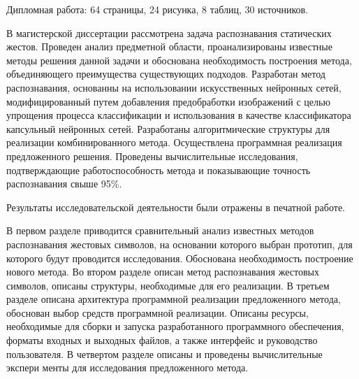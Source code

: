 \Referat
Дипломная работа: 64 страницы, 24 рисунка, 8 таблиц, 30 источников.

В магистерской диссертации рассмотрена задача распознавания статических жестов. Проведен анализ предметной области, проанализированы известные методы решения данной задачи и обоснована необходимость построения метода, объединяющего преимущества существующих подходов. Разработан метод распознавания, основанны на использовании искусственных нейронных сетей, модифицированный путем добавления предобработки изображений с целью упрощения процесса классификации и использования в качестве классификатора капсульный нейронных сетей. Разработаны алгоритмические структуры для реализации комбинированного метода. Осуществлена программная реализация предложенного решения. Прове­дены вычислительные исследования, подтверждающие работоспособ­ность метода и показывающие точность распознавания свыше 95\%.

Результаты исследовательской деятельности были отражены в печатной работе.

В первом разделе приводится сравнительный анализ известных методов распознавания жестовых символов, на основании которого выбран прототип, для которого будут проводится исследования. Обоснована необходимость построение нового метода. Во втором разделе описан метод распознавания жестовых символов, описаны структуры, необходимые для его реализации. В третьем разделе описана архитектура программной реализации предложенного метода, обоснован выбор средств программной реализации. Описаны ресурсы, необходимые для сборки и запуска разработанного программного обеспечения, форматы входных и выходных файлов, а также интерфейс и руководство пользователя. В четвертом разделе описаны и проведены вычислительные экспери­ менты для исследования предложенного метода.


